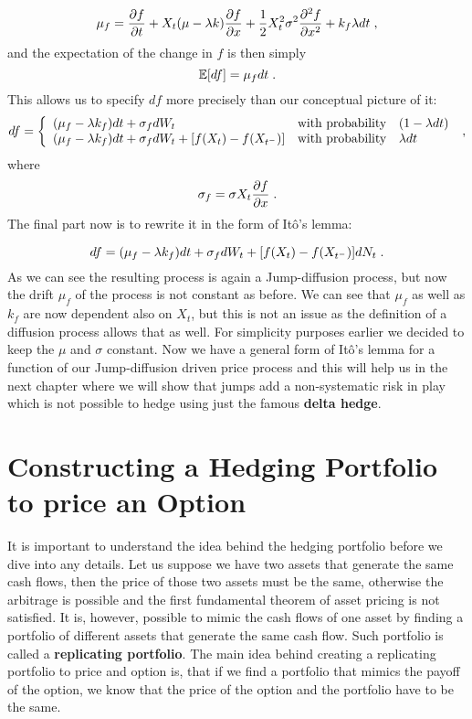 \documentclass[times, utf8, diplomski]{fer}
\begin{document}
\begin{equation}
	\mu_f = \frac{\partial f}{\partial t} + X_t(\mu - \lambda k)\frac{\partial f}{\partial x} + \frac{1}{2}X_t^2\sigma^2\frac{\partial^2 f}{\partial x^2} + k_f \lambda dt \hspace{0.1cm},
\end{equation}
and the expectation of the change in $f$ is then simply
$$
	\mathbb{E}[df] = \mu_f dt \hspace{0.1cm}.
$$
This allows us to specify $df$ more precisely than our conceptual picture of it:
$$
	df = \left\{  \begin{array}{lcl} (\mu_f - \lambda k_f)dt + \sigma_f dW_t & \mbox{with probability} & (1 - \lambda dt) \\
			  (\mu_f - \lambda k_f)dt + \sigma_f dW_t + [f(X_t) - f(X_{t^-})] & \mbox{with probability} & \lambda dt \end{array} \right.  \hspace{0.1cm},
$$ where $$ \sigma_f = \sigma X_t\frac{\partial f}{\partial x} \hspace{0.1cm}. $$
The final part now is to rewrite it in the form of It\^{o}'s lemma:

\begin{equation} \label{eqn_ito_lemma_jd}
	df = (\mu_f - \lambda k_f)dt + \sigma_f dW_t + [f(X_t) - f(X_{t^-})]dN_t \hspace{0.1cm}.
\end{equation}
As we can see the resulting process is again a Jump-diffusion process, but now the drift $\mu_f$ of the process is not constant as before. We can see that $\mu_f$ as well as $k_f$ are now dependent also on $X_t$, but this is not an issue as the definition of a diffusion process allows that as well. For simplicity purposes earlier we decided to keep the $\mu$ and $\sigma$ constant. Now we have a general form of It\^{o}'s lemma for a function of our Jump-diffusion driven price process and this will help us in the next chapter where we will show that jumps add a non-systematic risk in play which is not possible to hedge using just the famous \textbf{delta hedge}.

\section{Constructing a Hedging Portfolio to price an Option}
It is important to understand the idea behind the hedging portfolio before we dive into any details. Let us suppose we have two assets that generate the same cash flows, then the price of those two assets must be the same, otherwise the arbitrage is possible and the first fundamental theorem of asset pricing is not satisfied. It is, however, possible to mimic the cash flows of one asset by finding a portfolio of different assets that generate the same cash flow. Such portfolio is called a \textbf{replicating portfolio}. The main idea behind creating a replicating portfolio to price and option is, that if we find a portfolio that mimics the payoff of the option, we know that the price of the option and the portfolio have to be the same.
\end{document}

